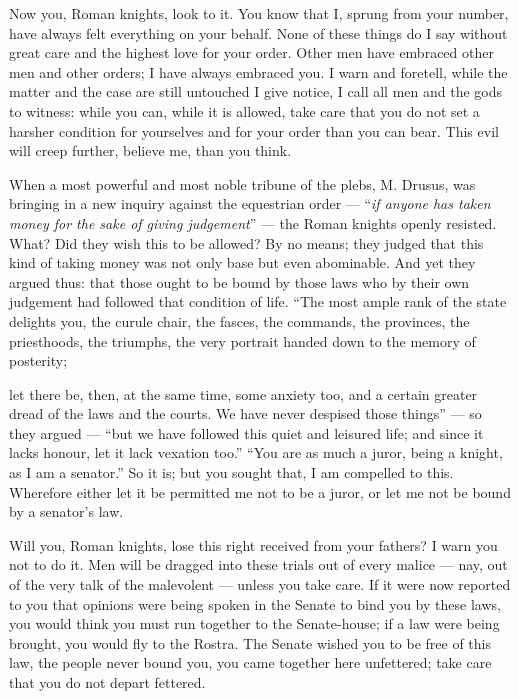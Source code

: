  Now you, Roman knights, look to it. You know that I, sprung from your number, have always felt everything on your behalf. None of these things do I say without great care and the highest love for your order. Other men have embraced other men and other orders; I have always embraced you. I warn and foretell, while the matter and the case are still untouched I give notice, I call all men and the gods to witness: while you can, while it is allowed, take care that you do not set a harsher condition for yourselves and for your order than you can bear. This evil will creep further, believe me, than you think.

 When a most powerful and most noble tribune of the plebs, M. Drusus, was bringing in a new inquiry against the equestrian order --- ``\textit{if anyone has taken money for the sake of giving judgement}'' --- the Roman knights openly resisted. What? Did they wish this to be allowed? By no means; they judged that this kind of taking money was not only base but even abominable. And yet they argued thus: that those ought to be bound by those laws who by their own judgement had followed that condition of life. ``The most ample rank of the state delights you, the curule chair, the fasces, the commands, the provinces, the priesthoods, the triumphs, the very portrait handed down to the memory of posterity;

 let there be, then, at the same time, some anxiety too, and a certain greater dread of the laws and the courts. We have never despised those things'' --- so they argued --- ``but we have followed this quiet and leisured life; and since it lacks honour, let it lack vexation too.'' ``You are as much a juror, being a knight, as I am a senator.'' So it is; but you sought that, I am compelled to this. Wherefore either let it be permitted me not to be a juror, or let me not be bound by a senator's law.

 Will you, Roman knights, lose this right received from your fathers? I warn you not to do it. Men will be dragged into these trials out of every malice --- nay, out of the very talk of the malevolent --- unless you take care. If it were now reported to you that opinions were being spoken in the Senate to bind you by these laws, you would think you must run together to the Senate-house; if a law were being brought, you would fly to the Rostra. The Senate wished you to be free of this law, the people never bound you, you came together here unfettered; take care that you do not depart fettered.

